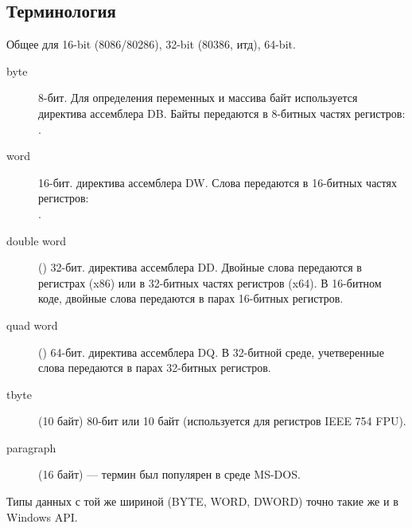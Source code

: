 
\subsection{Терминология}

Общее для 16-bit (8086/80286), 32-bit (80386, итд), 64-bit.

\begin{description}
	\item[byte] 8-бит. 
		Для определения переменных и массива байт используется директива ассемблера DB.
		Байты передаются в 8-битных частях регистров: .
	\item[word] 16-бит. \dittoclosing директива ассемблера DW.
		Слова передаются в 16-битных частях регистров: \\
			.
	\item[double word] () 32-бит. \dittoclosing директива ассемблера DD.
		Двойные слова передаются в регистрах (x86) или в 32-битных частях регистров (x64). 
		В 16-битном коде, двойные слова передаются в парах 16-битных регистров.
	\item[quad word] () 64-бит. \dittoclosing директива ассемблера DQ.
		В 32-битной среде, учетверенные слова передаются в парах 32-битных регистров.
	\item[tbyte] (10 байт) 80-бит или 10 байт (используется для регистров IEEE 754 FPU).
	\item[paragraph] (16 байт) --- термин был популярен в среде MS-DOS.
\end{description}

Типы данных с той же шириной (BYTE, WORD, DWORD) точно такие же и в Windows \ac{API}.


